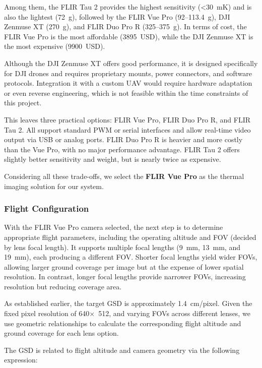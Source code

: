 \addtocounter{footnote}{14}
 

Among them, the FLIR Tau 2 provides the highest sensitivity (<30~mK) and is also the lightest (72~g), followed by the FLIR Vue Pro (92–113.4~g), DJI Zenmuse XT (270~g), and FLIR Duo Pro R (325–375~g). In terms of cost, the FLIR Vue Pro is the most affordable (3895~USD), while the DJI Zenmuse XT is the most expensive (9900~USD).

Although the DJI Zenmuse XT offers good performance, it is designed specifically for DJI drones and requires proprietary mounts, power connectors, and software protocols. Integration it with a custom UAV would require hardware adaptation or even reverse engineering, which is not feasible within the time constraints of this project.

This leaves three practical options: FLIR Vue Pro, FLIR Duo Pro R, and FLIR Tau 2. All support standard PWM or serial interfaces and allow real-time video output via USB or analog ports. FLIR Duo Pro R is heavier and more costly than the Vue Pro, with no major performance advantage. FLIR Tau 2 offers slightly better sensitivity and weight, but is nearly twice as expensive.

Considering all these trade-offs, we select the \textbf{FLIR Vue Pro} as the thermal imaging solution for our system.



\subsubsection{Flight Configuration}

With the FLIR Vue Pro camera selected, the next step is to determine appropriate flight parameters, including the operating altitude and FOV (decided by lens focal length). It supports multiple focal lengths (9~mm, 13~mm, and 19~mm), each producing a different FOV. Shorter focal lengths yield wider FOVs, allowing larger ground coverage per image but at the expense of lower spatial resolution. In contrast, longer focal lengths provide narrower FOVs, increasing resolution but reducing coverage area.

As established earlier, the target GSD is approximately 1.4~cm/pixel. Given the fixed pixel resolution of 640×~512, and varying FOVs across different lenses, we use geometric relationships to calculate the corresponding flight altitude and ground coverage for each lens option.

The GSD is related to flight altitude and camera geometry via the following expression:

